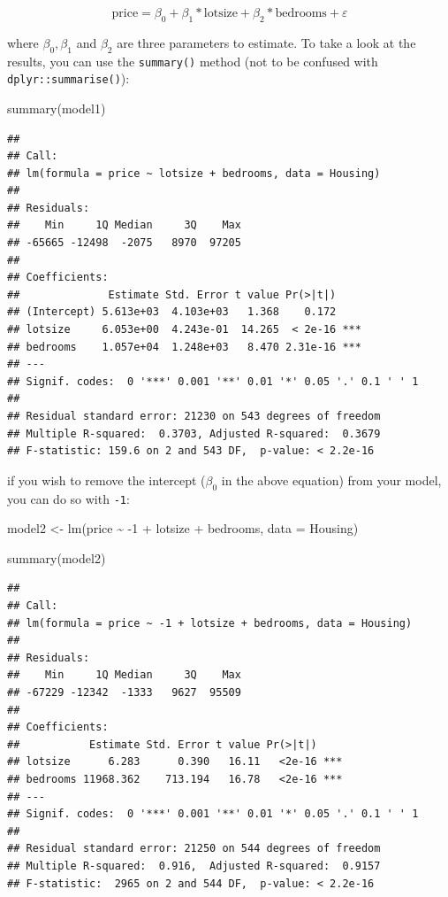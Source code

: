 \documentclass[
]{article}
\newenvironment{Shaded}{\begin{snugshade}}{\end{snugshade}}
\newcommand{\AttributeTok}[1]{\textcolor[rgb]{0.77,0.63,0.00}{#1}}
\newcommand{\DecValTok}[1]{\textcolor[rgb]{0.00,0.00,0.81}{#1}}
\newcommand{\FunctionTok}[1]{\textcolor[rgb]{0.00,0.00,0.00}{#1}}
\newcommand{\NormalTok}[1]{#1}
\newcommand{\OtherTok}[1]{\textcolor[rgb]{0.56,0.35,0.01}{#1}}
\newcommand{\SpecialCharTok}[1]{\textcolor[rgb]{0.00,0.00,0.00}{#1}}
\begin{document}
\[
\text{price} = \beta_0 + \beta_1 * \text{lotsize} + \beta_2 * \text{bedrooms} + \varepsilon
\]

where \(\beta_0, \beta_1\) and \(\beta_2\) are three parameters to estimate. To take a look at the
results, you can use the \texttt{summary()} method (not to be confused with \texttt{dplyr::summarise()}):

\begin{Shaded}
\begin{Highlighting}[]
\FunctionTok{summary}\NormalTok{(model1)}
\end{Highlighting}
\end{Shaded}

\begin{verbatim}
## 
## Call:
## lm(formula = price ~ lotsize + bedrooms, data = Housing)
## 
## Residuals:
##    Min     1Q Median     3Q    Max 
## -65665 -12498  -2075   8970  97205 
## 
## Coefficients:
##              Estimate Std. Error t value Pr(>|t|)    
## (Intercept) 5.613e+03  4.103e+03   1.368    0.172    
## lotsize     6.053e+00  4.243e-01  14.265  < 2e-16 ***
## bedrooms    1.057e+04  1.248e+03   8.470 2.31e-16 ***
## ---
## Signif. codes:  0 '***' 0.001 '**' 0.01 '*' 0.05 '.' 0.1 ' ' 1
## 
## Residual standard error: 21230 on 543 degrees of freedom
## Multiple R-squared:  0.3703, Adjusted R-squared:  0.3679 
## F-statistic: 159.6 on 2 and 543 DF,  p-value: < 2.2e-16
\end{verbatim}

if you wish to remove the intercept (\(\beta_0\) in the above equation) from your model, you can
do so with \texttt{-1}:

\begin{Shaded}
\begin{Highlighting}[]
\NormalTok{model2 }\OtherTok{\textless{}{-}} \FunctionTok{lm}\NormalTok{(price }\SpecialCharTok{\textasciitilde{}} \SpecialCharTok{{-}}\DecValTok{1} \SpecialCharTok{+}\NormalTok{ lotsize }\SpecialCharTok{+}\NormalTok{ bedrooms, }\AttributeTok{data =}\NormalTok{ Housing)}

\FunctionTok{summary}\NormalTok{(model2)}
\end{Highlighting}
\end{Shaded}

\begin{verbatim}
## 
## Call:
## lm(formula = price ~ -1 + lotsize + bedrooms, data = Housing)
## 
## Residuals:
##    Min     1Q Median     3Q    Max 
## -67229 -12342  -1333   9627  95509 
## 
## Coefficients:
##           Estimate Std. Error t value Pr(>|t|)    
## lotsize      6.283      0.390   16.11   <2e-16 ***
## bedrooms 11968.362    713.194   16.78   <2e-16 ***
## ---
## Signif. codes:  0 '***' 0.001 '**' 0.01 '*' 0.05 '.' 0.1 ' ' 1
## 
## Residual standard error: 21250 on 544 degrees of freedom
## Multiple R-squared:  0.916,  Adjusted R-squared:  0.9157 
## F-statistic:  2965 on 2 and 544 DF,  p-value: < 2.2e-16
\end{verbatim}
\end{document}
